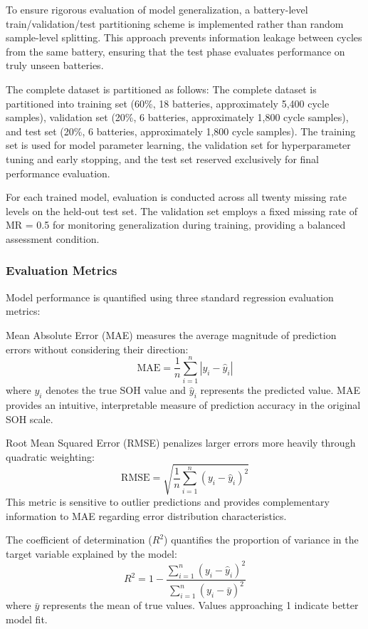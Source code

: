 \documentclass[5p,times]{elsarticle}
\begin{document}
To ensure rigorous evaluation of model generalization, a battery-level train/validation/test partitioning scheme is implemented rather than random sample-level splitting. This approach prevents information leakage between cycles from the same battery, ensuring that the test phase evaluates performance on truly unseen batteries.

The complete dataset is partitioned as follows:
The complete dataset is partitioned into training set (60\%, 18 batteries, approximately 5,400 cycle samples), validation set (20\%, 6 batteries, approximately 1,800 cycle samples), and test set (20\%, 6 batteries, approximately 1,800 cycle samples). The training set is used for model parameter learning, the validation set for hyperparameter tuning and early stopping, and the test set reserved exclusively for final performance evaluation.

For each trained model, evaluation is conducted across all twenty missing rate levels on the held-out test set. The validation set employs a fixed missing rate of MR = 0.5 for monitoring generalization during training, providing a balanced assessment condition.

\subsubsection{Evaluation Metrics}

Model performance is quantified using three standard regression evaluation metrics:

Mean Absolute Error (MAE) measures the average magnitude of prediction errors without considering their direction:
\begin{equation}
    \text{MAE} = \frac{1}{n} \sum_{i=1}^{n} |y_i - \hat{y}_i|
\end{equation}
where $y_i$ denotes the true SOH value and $\hat{y}_i$ represents the predicted value. MAE provides an intuitive, interpretable measure of prediction accuracy in the original SOH scale.

Root Mean Squared Error (RMSE) penalizes larger errors more heavily through quadratic weighting:
\begin{equation}
    \text{RMSE} = \sqrt{\frac{1}{n} \sum_{i=1}^{n} (y_i - \hat{y}_i)^2}
\end{equation}
This metric is sensitive to outlier predictions and provides complementary information to MAE regarding error distribution characteristics.

The coefficient of determination ($R^2$) quantifies the proportion of variance in the target variable explained by the model:
\begin{equation}
    R^2 = 1 - \frac{\sum_{i=1}^{n} (y_i - \hat{y}_i)^2}{\sum_{i=1}^{n} (y_i - \bar{y})^2}
\end{equation}
where $\bar{y}$ represents the mean of true values. Values approaching 1 indicate better model fit.
\end{document}
